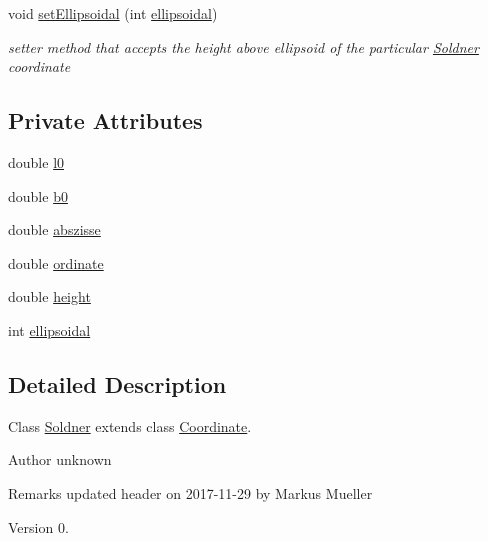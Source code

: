 \begin{DoxyCompactItemize}
void \hyperlink{classcoordinates_1_1_soldner_abf6ceb3d9b6edd741fdd05580b0593fa}{set\+Ellipsoidal} (int \hyperlink{classcoordinates_1_1_soldner_abef9061e0e316de4bba8f5e99292a2b5}{ellipsoidal})
\begin{DoxyCompactList}\small\item\em setter method that accepts the height above ellipsoid of the particular \hyperlink{classcoordinates_1_1_soldner}{Soldner} coordinate \end{DoxyCompactList}\end{DoxyCompactItemize}
\subsection*{Private Attributes}
\begin{DoxyCompactItemize}
\item 
double \hyperlink{classcoordinates_1_1_soldner_a4d8a0b1f4fce55f1d8be6433a2160b17}{l0}
\item 
double \hyperlink{classcoordinates_1_1_soldner_a489fa7e9e4c0c09e502bbbf2fb7ad689}{b0}
\item 
double \hyperlink{classcoordinates_1_1_soldner_ab1bec5d8a11e84c0cdc3154fd1abf843}{abszisse}
\item 
double \hyperlink{classcoordinates_1_1_soldner_ab13e1d9275b47a0754ed33c572dba57a}{ordinate}
\item 
double \hyperlink{classcoordinates_1_1_soldner_a4db9877edcf2391422fe532bd7131856}{height}
\item 
int \hyperlink{classcoordinates_1_1_soldner_abef9061e0e316de4bba8f5e99292a2b5}{ellipsoidal}
\end{DoxyCompactItemize}


\subsection{Detailed Description}
Class \hyperlink{classcoordinates_1_1_soldner}{Soldner} extends class \hyperlink{classcoordinates_1_1_coordinate}{Coordinate}. 

\begin{DoxyAuthor}{Author}
unknown 
\end{DoxyAuthor}
\begin{DoxyRemark}{Remarks}
updated header on 2017-\/11-\/29 by Markus Mueller 
\end{DoxyRemark}
\begin{DoxyVersion}{Version}
0. 
\end{DoxyVersion}

